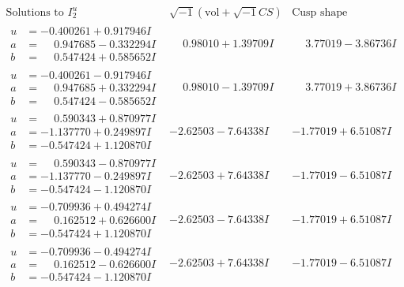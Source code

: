 \documentclass[1p]{elsarticle_modified}
\theoremstyle{definition}
\newcommand{\I}{\sqrt{-1}}
\begin{document}
$$\begin{array}{c|c|c}  
\text{Solutions to }I^u_{2}& \I (\text{vol} + \sqrt{-1}CS) & \text{Cusp shape}\\
 \hline 
\begin{aligned}
u &= -0.400261 + 0.917946 I \\
a &= \phantom{-}0.947685 - 0.332294 I \\
b &= \phantom{-}0.547424 + 0.585652 I\end{aligned}
 & \phantom{-}0.98010 + 1.39709 I & \phantom{-}3.77019 - 3.86736 I \\ \hline\begin{aligned}
u &= -0.400261 - 0.917946 I \\
a &= \phantom{-}0.947685 + 0.332294 I \\
b &= \phantom{-}0.547424 - 0.585652 I\end{aligned}
 & \phantom{-}0.98010 - 1.39709 I & \phantom{-}3.77019 + 3.86736 I \\ \hline\begin{aligned}
u &= \phantom{-}0.590343 + 0.870977 I \\
a &= -1.137770 + 0.249897 I \\
b &= -0.547424 + 1.120870 I\end{aligned}
 & -2.62503 - 7.64338 I & -1.77019 + 6.51087 I \\ \hline\begin{aligned}
u &= \phantom{-}0.590343 - 0.870977 I \\
a &= -1.137770 - 0.249897 I \\
b &= -0.547424 - 1.120870 I\end{aligned}
 & -2.62503 + 7.64338 I & -1.77019 - 6.51087 I \\ \hline\begin{aligned}
u &= -0.709936 + 0.494274 I \\
a &= \phantom{-}0.162512 + 0.626600 I \\
b &= -0.547424 + 1.120870 I\end{aligned}
 & -2.62503 - 7.64338 I & -1.77019 + 6.51087 I \\ \hline\begin{aligned}
u &= -0.709936 - 0.494274 I \\
a &= \phantom{-}0.162512 - 0.626600 I \\
b &= -0.547424 - 1.120870 I\end{aligned}
 & -2.62503 + 7.64338 I & -1.77019 - 6.51087 I \\ \hline\begin{aligned}

\end{aligned}
\end{array}$$
\end{document}
